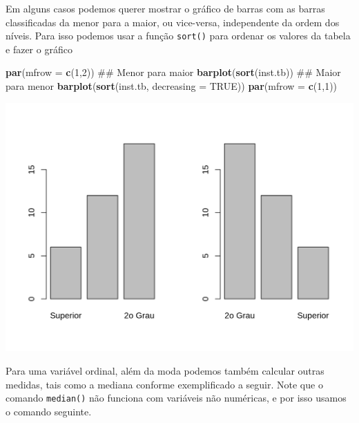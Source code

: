 \documentclass[10pt,a4paper]{book}
\newenvironment{Shaded}{\begin{snugshade}}{\end{snugshade}}
\newcommand{\KeywordTok}[1]{\textcolor[rgb]{0.13,0.29,0.53}{\textbf{#1}}}
\newcommand{\DataTypeTok}[1]{\textcolor[rgb]{0.13,0.29,0.53}{#1}}
\newcommand{\DecValTok}[1]{\textcolor[rgb]{0.00,0.00,0.81}{#1}}
\newcommand{\OtherTok}[1]{\textcolor[rgb]{0.56,0.35,0.01}{#1}}
\newcommand{\NormalTok}[1]{#1}
\begin{document}
Em alguns casos podemos querer mostrar o gráfico de barras com as barras
classificadas da menor para a maior, ou vice-versa, independente da
ordem dos níveis. Para isso podemos usar a função \texttt{sort()} para
ordenar os valores da tabela e fazer o gráfico

\begin{Shaded}
\begin{Highlighting}[]
\KeywordTok{par}\NormalTok{(}\DataTypeTok{mfrow =} \KeywordTok{c}\NormalTok{(}\DecValTok{1}\NormalTok{,}\DecValTok{2}\NormalTok{))}
\NormalTok{## Menor para maior}
\KeywordTok{barplot}\NormalTok{(}\KeywordTok{sort}\NormalTok{(inst.tb))}
\NormalTok{## Maior para menor}
\KeywordTok{barplot}\NormalTok{(}\KeywordTok{sort}\NormalTok{(inst.tb, }\DataTypeTok{decreasing =} \OtherTok{TRUE}\NormalTok{))}
\KeywordTok{par}\NormalTok{(}\DataTypeTok{mfrow =} \KeywordTok{c}\NormalTok{(}\DecValTok{1}\NormalTok{,}\DecValTok{1}\NormalTok{))}
\end{Highlighting}
\end{Shaded}

\begin{center}\includegraphics{figures/unnamed-chunk-297-1} \end{center}

Para uma variável ordinal, além da moda podemos também calcular outras
medidas, tais como a mediana conforme exemplificado a seguir. Note que o
comando \texttt{median()} não funciona com variáveis não numéricas, e
por isso usamos o comando seguinte.
\end{document}
